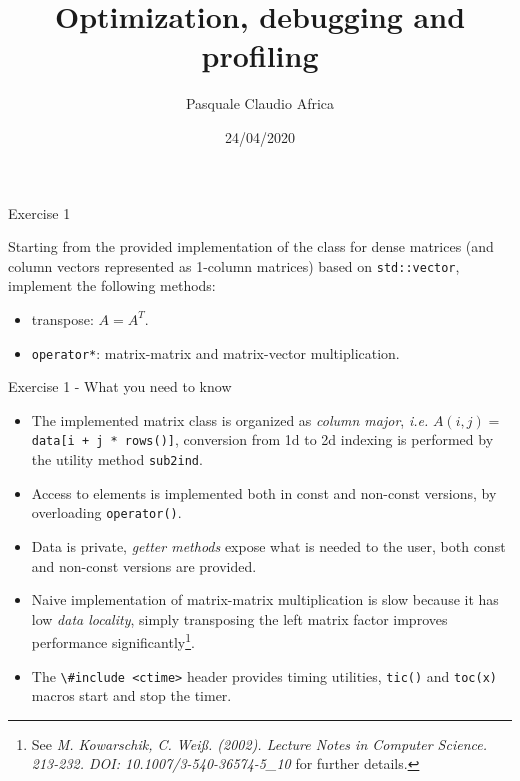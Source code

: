 \documentclass[10pt]{beamer}
\begin{document}
    \title{Optimization, debugging and profiling}
    \author{Pasquale Claudio Africa}
    \date{24/04/2020}

\begin{frame}
    \maketitle
\end{frame}

\begin{frame}{Exercise 1}

Starting from the provided implementation of the class for dense matrices (and column vectors represented as 1-column matrices) based on \lstinline{std::vector}, implement the following methods:
\begin{itemize}
\item transpose: $A = A^{T}$.
\item \lstinline{operator*}: matrix-matrix and matrix-vector multiplication.
\end{itemize}
\end{frame}

\begin{frame}{Exercise 1 - What you need to know}
\begin{itemize}
\item The implemented matrix class is organized as
      \emph{column major}, {\it i.e.}
      $A(i, j) = $ \lstinline{data[i + j * rows()]}, 
      conversion from 1d to 2d indexing is performed by the utility
      method \lstinline{sub2ind}.\\[3mm]
\item Access to elements is implemented both in const and non-const
      versions, by overloading \lstinline{operator()}. \\[3mm]
\item Data is private, \emph{getter methods} expose what is needed
      to the user, both const and non-const versions are provided. \\[3mm]
\item Naive implementation of matrix-matrix multiplication is slow 
      because it has low \emph{data locality}, simply transposing the left matrix factor improves performance significantly\footnote{See \textit{M. Kowarschik, C. Weiß. (2002). Lecture Notes in Computer Science. 213-232. DOI: 10.1007/3-540-36574-5\_10} for further details.}.\\[3mm]
\item The \lstinline{\#include <ctime>} header provides timing
      utilities, \lstinline{tic()} and \lstinline{toc(x)} macros
      start and stop the timer.
\end{itemize}
\end{frame}
\end{document}

